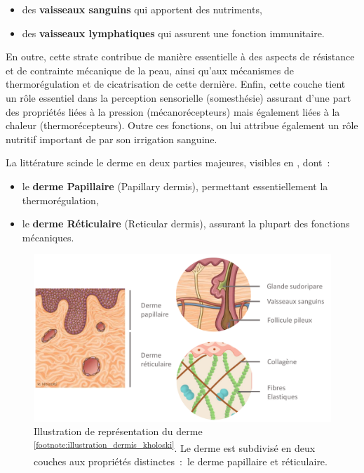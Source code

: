 \begin{itemize}
    \item des \textbf{vaisseaux sanguins} qui apportent des nutriments,
    \item des \textbf{vaisseaux lymphatiques} qui assurent une fonction immunitaire.
\end{itemize}\par

En outre, cette strate contribue de manière essentielle à des aspects de résistance et de contrainte mécanique de la peau, ainsi qu’aux mécanismes de thermorégulation et de cicatrisation de cette dernière. Enfin, cette couche tient un rôle essentiel dans la perception sensorielle (somesthésie) assurant d’une part des propriétés liées à la pression (mécanorécepteurs) mais également liées à la chaleur (thermorécepteurs). Outre ces fonctions, on lui attribue également un rôle nutritif important de par son irrigation sanguine.\par

La littérature scinde le derme en deux parties majeures, visibles en , dont~:
\begin{itemize}
    \item le \textbf{derme Papillaire} (Papillary dermis), permettant essentiellement la thermorégulation,
    \item le \textbf{derme Réticulaire} (Reticular dermis), assurant la plupart des fonctions mécaniques.
\end{itemize}\par

\begin{figure}[H]
    \centering
    \includegraphics[width=\linewidth]{contents/chapter_1/resources/illustration_dermis_kholoski.pdf}
    \caption{Illustration de représentation du derme \textsuperscript{\ref{footnote:illustration_dermis_kholoski}}. Le derme est subdivisé en deux couches aux propriétés distinctes~:~le derme papillaire et réticulaire.}
    \label{fig:illustration_dermis_kholoski}
\end{figure}\par

